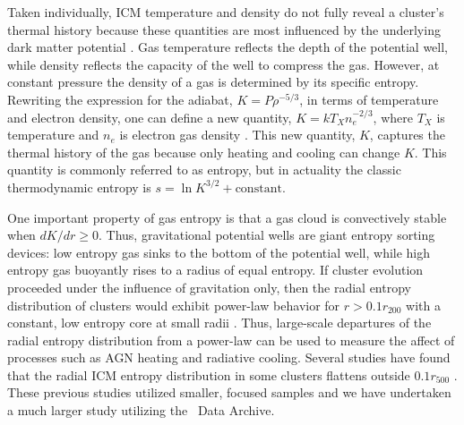 \documentclass[apj]{emulateapj}
\begin{document}

Taken individually, ICM temperature and density do not fully reveal a
cluster's thermal history because these quantities are most influenced
by the underlying dark matter potential \citep{voitbryan}. Gas
temperature reflects the depth of the potential well, while density
reflects the capacity of the well to compress the gas. However, at
constant pressure the density of a gas is determined by its specific
entropy. Rewriting the expression for the adiabat, $K=P\rho^{-5/3}$,
in terms of temperature and electron density, one can define a new
quantity, $K=kT_X n_e^{-2/3}$, where $T_X$ is temperature and $n_e$
is electron gas density \citep{1999Natur.397..135P, davies00}. This
new quantity, $K$, captures the thermal history of the gas because
only heating and cooling can change $K$. This quantity is commonly
referred to as entropy, but in actuality the classic thermodynamic
entropy is $s = \ln K^{3/2} + \mathrm{constant}$.

One important property of gas entropy is that a gas cloud is
convectively stable when $dK/dr \geq 0$. Thus, gravitational potential
wells are giant entropy sorting devices: low entropy gas sinks to the
bottom of the potential well, while high entropy gas buoyantly rises
to a radius of equal entropy. If cluster evolution proceeded under the
influence of gravitation only, then the radial entropy distribution of
clusters would exhibit power-law behavior for $r > 0.1 r_{200}$ with a
constant, low entropy core at small radii \citep{voitbryan}. Thus,
large-scale departures of the radial entropy distribution from a
power-law can be used to measure the affect of processes such as AGN
heating and radiative cooling. Several studies have found that the
radial ICM entropy distribution in some clusters flattens outside $0.1
r_{500}$ \citep{1996ApJ...473..692D, 1999Natur.397..135P, davies00,
2003MNRAS.343..331P, piffaretti05, radioquiet, d06, morandi07}. These
previous studies utilized smaller, focused samples and we have
undertaken a much larger study utilizing the \chandra\ Data Archive.
\end{document}
